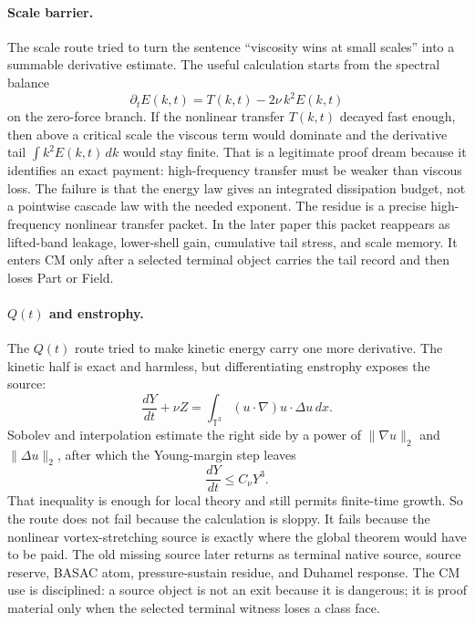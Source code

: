 \paragraph{Scale barrier.}
The scale route tried to turn the sentence ``viscosity wins at small scales''
into a summable derivative estimate.
The useful calculation starts from the spectral balance
\[
  \partial_tE(k,t)=T(k,t)-2\nu\,k^2E(k,t)
\]
on the zero-force branch.
If the nonlinear transfer \(T(k,t)\) decayed fast enough, then above a critical
scale the viscous term would dominate and the derivative tail
\(\int k^2E(k,t)\,dk\) would stay finite.
That is a legitimate proof dream because it identifies an exact payment:
high-frequency transfer must be weaker than viscous loss.
The failure is that the energy law gives an integrated dissipation budget, not
a pointwise cascade law with the needed exponent.
The residue is a precise high-frequency nonlinear transfer packet.
In the later paper this packet reappears as lifted-band leakage, lower-shell
gain, cumulative tail stress, and scale memory.
It enters CM only after a selected terminal object carries the tail record and
then loses Part or Field.

\paragraph{\(Q(t)\) and enstrophy.}
The \(Q(t)\) route tried to make kinetic energy carry one more derivative.
The kinetic half is exact and harmless, but differentiating enstrophy exposes
the source:
\[
  \frac{dY}{dt}+\nu Z=\int_{\mathbb T^3}(u\cdot\nabla)u\cdot\Delta u\,dx .
\]
Sobolev and interpolation estimate the right side by a power of
\(\|\nabla u\|_2\) and \(\|\Delta u\|_2\), after which the Young-margin step leaves
\[
  \frac{dY}{dt}\le C_\nu Y^3 .
\]
That inequality is enough for local theory and still permits finite-time
growth.
So the route does not fail because the calculation is sloppy.
It fails because the nonlinear vortex-stretching source is exactly where the
global theorem would have to be paid.
The old missing source later returns as terminal native source, source reserve,
BASAC atom, pressure-sustain residue, and Duhamel response.
The CM use is disciplined: a source object is not an exit because it is
dangerous; it is proof material only when the selected terminal witness loses a
class face.

